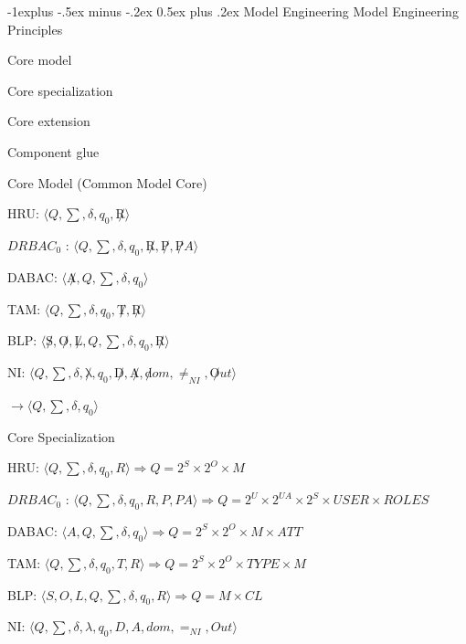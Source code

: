\documentclass[a4paper]{article}
\makeatletter
\renewcommand{\subsection}{\@startsection{subsection}{2}{0mm}%
                {-1explus -.5ex minus -.2ex}%
                {0.5ex plus .2ex}%
                {\normalfont\normalsize\bfseries}}
\makeatother
\begin{document}
\begin{multicols}{3}
    \subsection{Model Engineering}
    Model Engineering Principles
    \begin{itemize*}
        \item Core model
        \item Core specialization
        \item Core extension
        \item Component glue
    \end{itemize*}

    Core Model (Common Model Core)
    \begin{itemize*}
        \item HRU: $\langle Q, \sum , \delta, q_0 , \not R \rangle$
        \item $DRBAC_0$ : $\langle Q, \sum , \delta, q_0 , \not R, \not P, \not PA \rangle$
        \item DABAC: $\langle \not A , Q ,\sum , \delta, q_0 \rangle$
        \item TAM: $\langle Q , \sum , \delta, q_0 , \not T, \not R \rangle$
        \item BLP: $\langle \not S, \not O, \not L, Q , \sum , \delta, q_0 , \not R \rangle$
        \item NI: $\langle Q , \sum , \delta, \not \lambda ,q_0 , \not D, \not A, \not dom, \not =_{NI} , \not Out \rangle$
        \item $\rightarrow \langle Q ,\sum , \delta, q_0 \rangle$
    \end{itemize*}

    Core Specialization
    \begin{itemize*}
        \item HRU: $\langle Q, \sum , \delta, q_0 , R \rangle \Rightarrow Q = 2^S \times 2^O \times M$
        \item $DRBAC_0$ : $\langle Q, \sum , \delta, q_0 , R, P, PA \rangle \Rightarrow Q = 2^U\times 2^{UA}\times 2^S \times USER \times ROLES$
        \item DABAC: $\langle A , Q ,\sum , \delta, q_0 \rangle \Rightarrow Q = 2^S\times 2^O \times M\times ATT$
        \item TAM: $\langle Q , \sum , \delta, q_0 , T, R \rangle \Rightarrow Q = 2^S\times 2^O\times TYPE \times M$
        \item BLP: $\langle S, O, L, Q , \sum , \delta, q_0 , R \rangle \Rightarrow Q = M \times CL$
        \item NI: $\langle Q , \sum , \delta, \lambda ,q_0 , D, A, dom, =_{NI} , Out \rangle$
    \end{itemize*}


\end{multicols}
\end{document}
